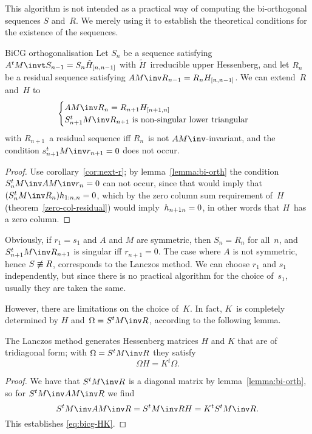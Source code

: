 \documentclass[11pt]{artikel3}
\begin{document}
\begin{Outline}
This algorithm is not intended as a practical way of computing the
bi-orthogonal sequences $S$ and~$R$. We merely using it to establish
the theoretical conditions for the existence of the sequences.

\begin{ttheorem}{BiCG orthogonalisation}
Let $S_n$ be a sequence satisfying $A^tM\invt S_{n-1}=S_n\tilde H_{[n,n-1]}$
with $\tilde H$~irreducible upper Hessenberg,
and let $R_n$ be a residual sequence satisfying
$AM\inv R_{n-1}=R_nH_{[n,n-1]}$.
We can extend~$R$ and~$H$ to
\[ \begin{cases}AM\inv R_n=R_{n+1}H_{[n+1,n]}\cr
      \hbox{$S_{n+1}^tM\inv R_{n+1}$ 
                is non-singular lower triangular}\end{cases} \]
with $R_{n+1}$~a residual sequence iff $R_n$~is not $AM\inv$-invariant,
and the condition $s_{n+1}^tM\inv r_{n+1}=0$ does not occur.
\end{ttheorem}
\begin{proof}
Use corollary~\ref{cor:next-r}; by lemma~\ref{lemma:bi-orth}
the condition $S_n^tM\inv AM\inv r_n=\nobreak0$ can not occur,
since that would imply that $(S_n^tM\inv R_n)h_{1:n,n}=\nobreak 0$,
which by the zero column  sum requirement of~$H$
(theorem~\ref{zero-col-residual})
would imply~$h_{n+1n}=\nobreak0$,
in other words that $H$~has a zero column.
\end{proof}

Obviously, if $r_1=s_1$ and $A$ and $M$ are symmetric,
then $S_n=R_n$ for all~$n$, and $S_{n+1}^tM\inv R_{n+1}$ is
singular iff $r_{n+1}=0$.
The case where $A$ is not symmetric, hence $S\not\equiv\nobreak R$,
corresponds to the Lanczos method.
We can choose $r_1$ and $s_1$ independently, but since there is
no practical algorithm for the choice of~$s_1$, usually they
are taken the same.

However, there are limitations on the choice of~$K$. In fact,
$K$~is completely determined by $H$ and~$\Omega=S^tM\inv R$,
according to the following lemma.

\begin{lemma}\label{lanczos:H}
The Lanczos method generates Hessenberg matrices $H$ and $K$ that are
of tridiagonal form; with $\Omega=S^tM\inv R$ they satisfy
\begin{equation}\Omega H=K^t\Omega.\label{eq:bicg-HK}\end{equation}
\end{lemma}
\begin{proof}
We have that $S^tM\inv R$ is a diagonal matrix by lemma~\ref{lemma:bi-orth},
so for $S^tM\inv AM\inv R$ we find
\[S^tM\inv AM\inv R =S^tM\inv RH =K^tS^tM\inv R. \]
This establishes \eqref{eq:bicg-HK}.
\end{proof}


\end{Outline}
\end{document}
